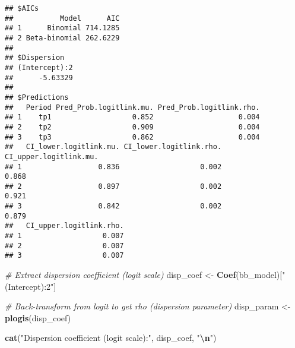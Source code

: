 \documentclass[
]{article}
\newenvironment{Shaded}{\begin{snugshade}}{\end{snugshade}}
\newcommand{\AttributeTok}[1]{\textcolor[rgb]{0.13,0.29,0.53}{#1}}
\newcommand{\CommentTok}[1]{\textcolor[rgb]{0.56,0.35,0.01}{\textit{#1}}}
\newcommand{\DecValTok}[1]{\textcolor[rgb]{0.00,0.00,0.81}{#1}}
\newcommand{\FunctionTok}[1]{\textcolor[rgb]{0.13,0.29,0.53}{\textbf{#1}}}
\newcommand{\NormalTok}[1]{#1}
\newcommand{\OtherTok}[1]{\textcolor[rgb]{0.56,0.35,0.01}{#1}}
\newcommand{\SpecialCharTok}[1]{\textcolor[rgb]{0.81,0.36,0.00}{\textbf{#1}}}
\newcommand{\StringTok}[1]{\textcolor[rgb]{0.31,0.60,0.02}{#1}}
\begin{document}
\begin{Shaded}
\end{Shaded}

\begin{verbatim}
## $AICs
##           Model      AIC
## 1      Binomial 714.1285
## 2 Beta-binomial 262.6229
## 
## $Dispersion
## (Intercept):2 
##      -5.63329 
## 
## $Predictions
##   Period Pred_Prob.logitlink.mu. Pred_Prob.logitlink.rho.
## 1    tp1                   0.852                    0.004
## 2    tp2                   0.909                    0.004
## 3    tp3                   0.862                    0.004
##   CI_lower.logitlink.mu. CI_lower.logitlink.rho. CI_upper.logitlink.mu.
## 1                  0.836                   0.002                  0.868
## 2                  0.897                   0.002                  0.921
## 3                  0.842                   0.002                  0.879
##   CI_upper.logitlink.rho.
## 1                   0.007
## 2                   0.007
## 3                   0.007
\end{verbatim}

\begin{Shaded}
\begin{Highlighting}[]
\CommentTok{\# Extract dispersion coefficient (logit scale)}
\NormalTok{disp\_coef }\OtherTok{\textless{}{-}} \FunctionTok{Coef}\NormalTok{(bb\_model)[}\StringTok{"(Intercept):2"}\NormalTok{]}

\CommentTok{\# Back{-}transform from logit to get rho (dispersion parameter)}
\NormalTok{disp\_param }\OtherTok{\textless{}{-}} \FunctionTok{plogis}\NormalTok{(disp\_coef)}

\FunctionTok{cat}\NormalTok{(}\StringTok{"Dispersion coefficient (logit scale):"}\NormalTok{, disp\_coef, }\StringTok{"}\SpecialCharTok{\textbackslash{}n}\StringTok{"}\NormalTok{)}
\end{Highlighting}
\end{Shaded}
\end{document}
